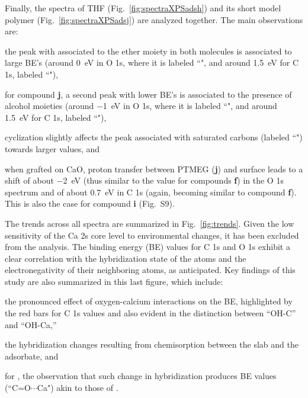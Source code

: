 \documentclass[%
aip,
amsmath,amssymb,
preprint,%
jcp,
showkeys,
]{revtex4-2}
\begin{document}

\clearpage

Finally, the spectra of THF (Fig.~\ref{fig:spectraXPSadsh}) and its short model polymer (Fig.~\ref{fig:spectraXPSadsj}) are analyzed together. The main observations are: \begin{inparaenum}[(i)]
	\item the peak with associated to the ether moiety in both molecules is associated to large BE's (around \SI{0}{\electronvolt} in O 1s, where it is labeled ``", and around \SI{1.5}{\electronvolt} for C 1s, labeled ``"), 
	\item for compound \textbf{j}, a second peak with lower BE's is associated to the presence of alcohol moieties (around \SI{-1}{\electronvolt} in O 1s, where it is labeled ``", and around \SI{1.5}{\electronvolt} for C 1s, labeled ``"), 
	\item cyclization slightly affects the peak associated with saturated carbons (labeled ``") towards larger values, and
	\item when grafted on CaO, proton transfer between PTMEG (\textbf{j}) and surface leads to a shift of about \SI{-2}{\electronvolt}  (thus similar to the value for compounds \textbf{f}) in the O 1s spectrum and of about \SI{0.7}{\electronvolt} in C 1s (again, becoming similar to compound \textbf{f}). This is also the case for compound \textbf{i} (Fig.~S9).
\end{inparaenum}


\clearpage

The trends across all spectra are summarized in Fig.~\ref{fig:trends}. Given the low sensitivity of the Ca 2s core level to environmental changes, it has been excluded from the analysis. The binding energy (BE) values for C 1s and O 1s exhibit a clear correlation with the hybridization state of the atoms and the electronegativity of their neighboring atoms, as anticipated.\cite{stevieIntroductionXrayPhotoelectron2020} 
Key findings of this study are also summarized in this last figure, which include: 
\begin{inparaenum}[(i)]
	\item the pronounced effect of oxygen-calcium interactions on the BE, highlighted by the red bars for C 1s values and also evident in the distinction between ``OH-C'' and ``OH-Ca,'' 
	\item the hybridization changes resulting from chemisorption between the slab and the adsorbate, and 
	\item for , the observation that such change in hybridization produces BE values (``C=O$\cdots$Ca") akin to those of .
\end{inparaenum}
\end{document}
